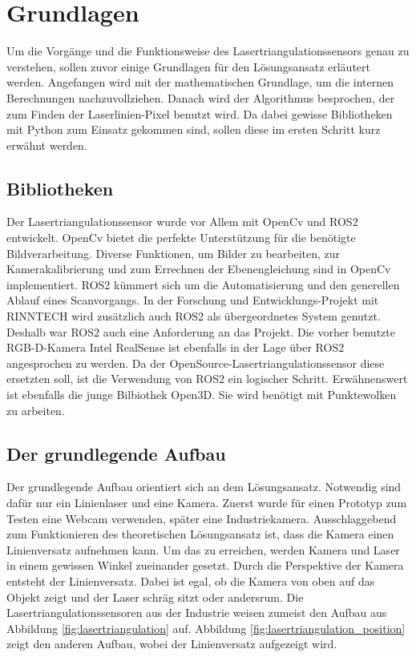 \section{Grundlagen}\label{grundlagen}
	Um die Vorgänge und die Funktionsweise des Lasertriangulationssensors genau zu verstehen, sollen zuvor einige Grundlagen für den Lösungsansatz erläutert werden. Angefangen wird mit der mathematischen Grundlage, um die internen Berechnungen nachzuvollziehen. Danach wird der Algorithmus besprochen, der zum Finden der Laserlinien-Pixel benutzt wird. Da dabei gewisse Bibliotheken mit Python zum Einsatz gekommen sind, sollen diese im ersten Schritt kurz erwähnt werden.
	
	\subsection{Bibliotheken}
	Der Lasertriangulationssensor wurde vor Allem mit OpenCv und ROS2 entwickelt. OpenCv bietet die perfekte Unterstützung für die benötigte Bildverarbeitung. Diverse Funktionen, um Bilder zu bearbeiten, zur Kamerakalibrierung und zum Errechnen der Ebenengleichung sind in OpenCv implementiert. \newline
	ROS2 kümmert sich um die Automatisierung und den generellen Ablauf eines Scanvorgangs. In der Forschung und Entwicklungs-Projekt mit RINNTECH wird zusätzlich auch ROS2 als übergeordnetes System genutzt. Deshalb war ROS2 auch eine Anforderung an das Projekt. Die vorher benutzte RGB-D-Kamera Intel RealSense ist ebenfalls in der Lage über ROS2 angesprochen zu werden. Da der OpenSource-Lasertriangulationssensor diese ersetzten soll, ist die Verwendung von ROS2 ein logischer Schritt. \newline
	Erwähnenswert  ist ebenfalls die junge Bilbiothek Open3D. Sie wird benötigt mit Punktewolken zu arbeiten.
	
	\subsection{Der grundlegende Aufbau}
	Der grundlegende Aufbau orientiert sich an dem Lösungsansatz. Notwendig sind dafür nur ein Linienlaser und eine Kamera. Zuerst wurde für einen Prototyp zum Testen eine Webcam verwenden, später eine Industriekamera. Ausschlaggebend zum Funktionieren des theoretischen Lösungsansatz ist, dass die Kamera einen Linienversatz aufnehmen kann. Um das zu erreichen, werden Kamera und Laser in einem gewissen Winkel zueinander gesetzt. Durch die Perspektive der Kamera entsteht der Linienversatz. Dabei ist egal, ob die Kamera von oben auf das Objekt zeigt und der Laser schräg sitzt oder andersrum. Die Lasertriangulationssensoren aus der Industrie weisen zumeist den Aufbau aus Abbildung \ref{fig:lasertriangulation} auf. Abbildung \ref{fig:lasertriangulation_position} zeigt den anderen Aufbau, wobei der Linienversatz aufgezeigt wird.
	
